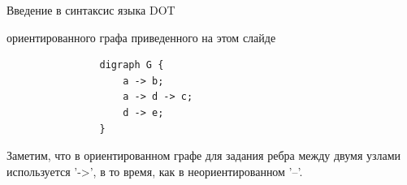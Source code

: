 \documentclass{beamer}
\begin{document}
\begin{frame}[fragile]{Введение в синтаксис языка DOT}
	\begin{minipage}{0.5\textwidth}
		 ориентированного графа приведенного на этом слайде
		\begin{verbatim}
				digraph G {
				    a -> b;
				    a -> d -> c;
				    d -> e;
				}
		\end{verbatim}
	\end{minipage}
	\hfill
	\begin{minipage}{0.45\textwidth}
	\end{minipage}
	\newline
	\newline
	\color{red}Заметим\color{black}, что в ориентированном графе для задания ребра между двумя узлами используется \color{red}'->'\color{black}, в то время, как в неориентированном \color{red}'--'\color{black}.
\end{frame}  
\end{document}

